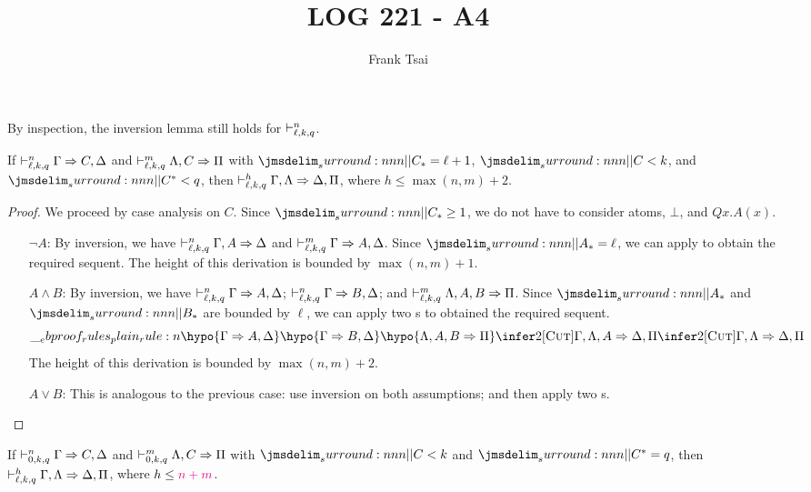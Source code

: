 \documentclass[a4paper]{article}
\title{LOG 221 - A4}
\author{Frank Tsai}
\begin{document}
\maketitle


By inspection, the inversion lemma still holds for $\mathrel{\vdash^{n}_{\ell,k,q}}$.
\begin{lemma}\label{0000}
  If $\mathrel{\vdash^{n}_{\ell,k,q}} \Gamma \Rightarrow C,\Delta$ and $\mathrel{\vdash^{m}_{\ell,k,q}} \Lambda,C \Rightarrow \Pi$ with $\dRank{C} = \ell + 1$, $\cRank{C} < k$, and $\qRank{C} < q$, then $\mathrel{\vdash^{h}_{\ell,k,q}} \Gamma,\Lambda \Rightarrow \Delta,\Pi$, where $h \leq \max(n,m) + 2$.
\end{lemma}
\begin{proof}
  We proceed by case analysis on $C$.
  Since $\dRank{C} \geq 1$, we do not have to consider atoms, $\bot$, and $Qx.A(x)$.
  \begin{itemize}
  \item[$\lnot A$:] By inversion, we have $\mathrel{\vdash^{n}_{\ell,k,q}} \Gamma,A \Rightarrow \Delta$ and $\mathrel{\vdash^{m}_{\ell,k,q}} \Gamma \Rightarrow A, \Delta$.
    Since $\dRank{A} = \ell$, we can apply \rCut{} to obtain the required sequent.
    The height of this derivation is bounded by $\max(n,m) + 1$.
  \item[$A \wedge B$:] By inversion, we have $\mathrel{\vdash^{n}_{\ell,k,q}} \Gamma \Rightarrow A,\Delta$; $\mathrel{\vdash^{n}_{\ell,k,q}} \Gamma \Rightarrow B,\Delta$; and $\mathrel{\vdash^{m}_{\ell,k,q}} \Lambda,A,B \Rightarrow \Pi$.
    Since $\dRank{A}$ and $\dRank{B}$ are bounded by $\ell$, we can apply two \rCut{}s to obtained the required sequent.
    \[
      \ebrule{
        \hypo{\Gamma \Rightarrow A,\Delta}
        \hypo{\Gamma \Rightarrow B,\Delta}
        \hypo{\Lambda,A,B \Rightarrow \Pi}
        \infer2[\rCut]{\Gamma,\Lambda,A \Rightarrow \Delta,\Pi}
        \infer2[\rCut]{\Gamma,\Lambda \Rightarrow \Delta,\Pi}
      }
    \]
    The height of this derivation is bounded by $\max(n,m) + 2$.
  \item[$A \vee B$:] This is analogous to the previous case: use inversion on both assumptions; and then apply two \rCut{}s.
  \end{itemize}
\end{proof}

\begin{lemma}\label{0004}
  If $\mathrel{\vdash^{n}_{0,k,q}} \Gamma \Rightarrow C,\Delta$ and $\mathrel{\vdash^{m}_{0,k,q}} \Lambda,C \Rightarrow \Pi$ with $\cRank{C} < k$ and $\qRank{C} = q$, then $\mathrel{\vdash^{h}_{\ell,k,q}} \Gamma,\Lambda \Rightarrow \Delta,\Pi$, where $h \leq \textcolor{magenta}{n + m}$.
\end{lemma}
\end{document}
